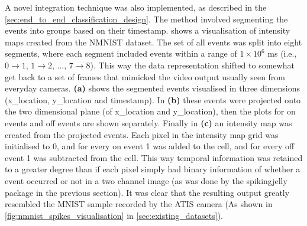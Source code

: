 A novel integration technique was also implemented, as described in the \cref{sec:end_to_end_classification_design}. The method involved segmenting the events into groups based on their timestamp.  shows a visualisation of intensity maps created from the NMNIST\cite{NMNIST} dataset. The set of all events was split into eight segments, where each segment included events within a range of $ 1 \times 10^6 $ ms (i.e., $ 0 \rightarrow 1 $, $ 1 \rightarrow 2 $, ..., $ 7 \rightarrow 8 $). This way the data representation shifted to somewhat get back to a set of frames that mimicked the video output usually seen from everyday cameras. \textbf{(a)} shows the segmented events visualised in three dimensions (x\_location, y\_location and timestamp). In \textbf{(b)} these events were projected onto the two dimensional plane (of x\_location and y\_location), then the plots for on events and off events are shown separately. Finally in \textbf{(c)} an intensity map was created from the projected events. Each pixel in the intensity map grid was initialised to 0, and for every on event 1 was added to the cell, and for every off event 1 was subtracted from the cell. This way temporal information was retained to a greater degree than if each pixel simply had binary information of whether a event occurred or not in a two channel image (as was done by the spikingjelly package\cite{SpikingJelly} in the previous section). It was clear that the resulting output greatly resembled the MNIST\cite{MNIST} sample recorded by the ATIS camera (As shown in \cref{fig:nmnist_spikes_visualisation} in \cref{sec:existing_datasets}).


